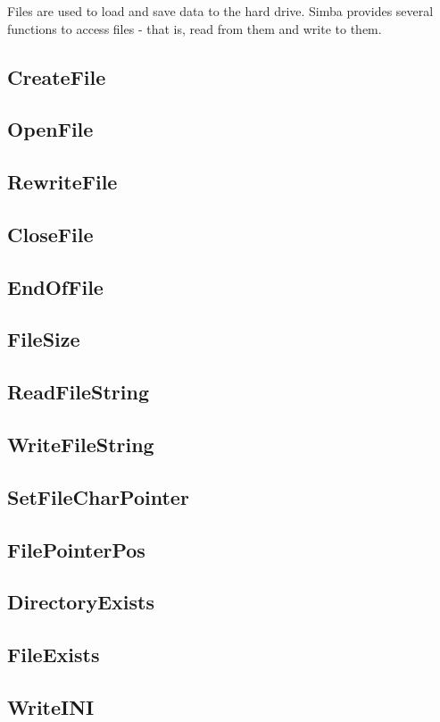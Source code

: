 \documentclass[a4paper]{report}
\begin{document}
{Files are used to load and save data to the hard drive.
Simba provides several functions to access files - that is, read
from them and write to them.


\subsection{CreateFile}
\subsection{OpenFile}
\subsection{RewriteFile}
\subsection{CloseFile}
\subsection{EndOfFile}
\subsection{FileSize}
\subsection{ReadFileString}
\subsection{WriteFileString}
\subsection{SetFileCharPointer}
\subsection{FilePointerPos}
\subsection{DirectoryExists}
\subsection{FileExists}
\subsection{WriteINI}
}
\end{document}
